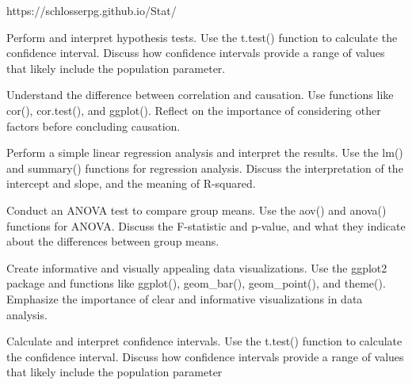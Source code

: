 https://schlosserpg.github.io/Stat/


Perform and interpret hypothesis tests. Use the t.test() function to calculate the confidence interval. Discuss how confidence intervals provide a range of values that likely include the population parameter.

Understand the difference between correlation and causation. Use functions like cor(), cor.test(), and ggplot(). Reflect on the importance of considering other factors before concluding causation.

Perform a simple linear regression analysis and interpret the results. Use the lm() and summary() functions for regression analysis. Discuss the interpretation of the intercept and slope, and the meaning of R-squared.

 Conduct an ANOVA test to compare group means. Use the aov() and anova() functions for ANOVA. Discuss the F-statistic and p-value, and what they indicate about the differences between group means.

Create informative and visually appealing data visualizations. Use the ggplot2 package and functions like ggplot(), geom_bar(), geom_point(), and theme(). Emphasize the importance of clear and informative visualizations in data analysis.

Calculate and interpret confidence intervals. Use the t.test() function to calculate the confidence interval. Discuss how confidence intervals provide a range of values that likely include the population parameter


